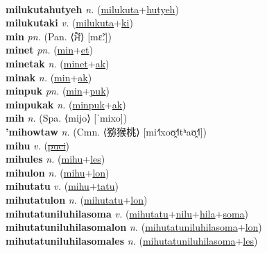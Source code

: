  \label{milukutalon} \\
\textbf{milukutahutyeh} \textit{n.} (\hyperref[milukuta]{milukuta}+\hyperref[hutyeh]{hutyeh})
 \label{milukutahutyeh} \\
\textbf{milukutaki} \textit{v.} (\hyperref[milukuta]{milukuta}+\hyperref[ki]{ki})
 \label{milukutaki} \\
\textbf{min} \textit{pn.} (Pan. ⟨ਮੈਂ⟩ [mɛ̃ː])
 \label{min} \\
\textbf{minet} \textit{pn.} (\hyperref[min]{min}+\hyperref[et]{et})
 \label{minet} \\
\textbf{minetak} \textit{n.} (\hyperref[minet]{minet}+\hyperref[ak]{ak})
 \label{minetak} \\
\textbf{minak} \textit{n.} (\hyperref[min]{min}+\hyperref[ak]{ak})
 \label{minak} \\
\textbf{minpuk} \textit{pn.} (\hyperref[min]{min}+\hyperref[puk]{puk})
 \label{minpuk} \\
\textbf{minpukak} \textit{n.} (\hyperref[minpuk]{minpuk}+\hyperref[ak]{ak})
 \label{minpukak} \\
\textbf{mih} \textit{n.} (Spa. ⟨mijo⟩ [ˈmixo])
 \label{mih} \\
\textbf{'mihowtaw} \textit{n.} (Cmn. ⟨猕猴桃⟩ [mi˧˥xoʊ̯˧˥tʰaʊ̯˧˥])
 \label{'mihowtaw} \\
\textbf{mihu} \textit{v.} (\hyperref[puci]{\sout{puci}})
 \label{mihu} \\
\textbf{mihules} \textit{n.} (\hyperref[mihu]{mihu}+\hyperref[les]{les})
 \label{mihules} \\
\textbf{mihulon} \textit{n.} (\hyperref[mihu]{mihu}+\hyperref[lon]{lon})
 \label{mihulon} \\
\textbf{mihutatu} \textit{v.} (\hyperref[mihu]{mihu}+\hyperref[tatu]{tatu})
 \label{mihutatu} \\
\textbf{mihutatulon} \textit{n.} (\hyperref[mihutatu]{mihutatu}+\hyperref[lon]{lon})
 \label{mihutatulon} \\
\textbf{mihutatuniluhilasoma} \textit{v.} (\hyperref[mihutatu]{mihutatu}+\hyperref[nilu]{nilu}+\hyperref[hila]{hila}+\hyperref[soma]{soma})
 \label{mihutatuniluhilasoma} \\
\textbf{mihutatuniluhilasomalon} \textit{n.} (\hyperref[mihutatuniluhilasoma]{mihutatuniluhilasoma}+\hyperref[lon]{lon})
 \label{mihutatuniluhilasomalon} \\
\textbf{mihutatuniluhilasomales} \textit{n.} (\hyperref[mihutatuniluhilasoma]{mihutatuniluhilasoma}+\hyperref[les]{les})
 \label{mihutatuniluhilasomales} \\
